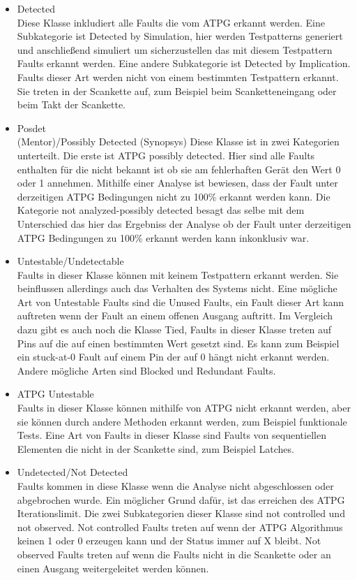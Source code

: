 \documentclass[12pt,a4paper]{article}
\begin{document}
\begin{itemize}

\item Detected\\
Diese Klasse inkludiert alle Faults die vom ATPG erkannt werden. Eine Subkategorie ist Detected by Simulation, hier 
werden Testpatterns generiert und anschließend simuliert um sicherzustellen das mit diesem Testpattern Faults erkannt werden.
Eine andere Subkategorie ist Detected by Implication. Faults dieser Art werden nicht von einem bestimmten Testpattern erkannt.
Sie treten in der Scankette auf, zum Beispiel beim Scanketteneingang oder beim Takt der Scankette.

\item Posdet\\ (Mentor)/Possibly Detected (Synopsys)
Diese Klasse ist in zwei Kategorien unterteilt. Die erste ist ATPG possibly detected. Hier sind alle Faults enthalten für die
nicht bekannt ist ob sie am fehlerhaften Gerät den Wert 0 oder 1 annehmen. Mithilfe einer Analyse ist bewiesen, dass der Fault
unter derzeitigen ATPG Bedingungen nicht zu 100\% erkannt werden kann. Die Kategorie not analyzed-possibly detected besagt das selbe
mit dem Unterschied das hier das Ergebniss der Analyse ob der Fault unter derzeitigen ATPG Bedingungen zu 100\% erkannt werden kann
inkonklusiv war.

\item Untestable/Undetectable\\
Faults in dieser Klasse können mit keinem Testpattern erkannt werden. Sie beinflussen allerdings auch das Verhalten des
Systems nicht. Eine mögliche Art von Untestable Faults sind die Unused Faults, ein Fault dieser Art kann auftreten wenn 
der Fault an einem offenen Ausgang auftritt. Im Vergleich dazu gibt es auch noch die Klasse Tied, Faults in dieser Klasse
treten auf Pins auf die auf einen bestimmten Wert gesetzt sind. Es kann zum Beispiel ein stuck-at-0 Fault auf einem Pin
der auf 0 hängt nicht erkannt werden. Andere mögliche Arten sind Blocked und Redundant Faults.

\item ATPG Untestable\\
Faults in dieser Klasse können mithilfe von ATPG nicht erkannt werden, aber sie können durch andere Methoden erkannt werden,
zum Beispiel funktionale Tests. Eine Art von Faults in dieser Klasse sind Faults von sequentiellen Elementen die nicht in der
Scankette sind, zum Beispiel Latches.

\item Undetected/Not Detected\\
Faults kommen in diese Klasse wenn die Analyse nicht abgeschlossen oder abgebrochen wurde. Ein möglicher Grund dafür,
ist das erreichen des ATPG Iterationslimit. Die zwei Subkategorien dieser Klasse sind not controlled und not observed.
Not controlled Faults treten auf wenn der ATPG Algorithmus keinen 1 oder 0 erzeugen kann und der Status immer auf X bleibt.
Not observed Faults treten auf wenn die Faults nicht in die Scankette oder an einen Ausgang weitergeleitet werden können.

\end{itemize}
\end{document}
